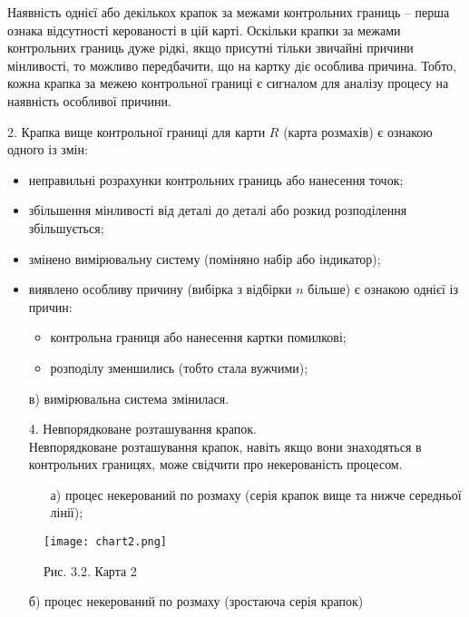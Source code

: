 Наявність однієї або декількох крапок за межами контрольних границь –
перша ознака відсутності керованості в цій карті. Оскільки крапки за межами
контрольних границь дуже рідкі, якщо присутні тільки звичайні причини
мінливості, то можливо передбачити, що на картку діє особлива причина.
Тобто, кожна крапка за межею контрольної границі є сигналом для аналізу
процесу на наявність особливої причини.

2. Крапка вище контрольної границі для карти $R$ (карта розмахів) є
ознакою одного із змін:

\begin{itemize}
    \item неправильні розрахунки контрольних границь або нанесення точок;
    \item збільшення мінливості від деталі до деталі або розкид розподілення збільшується;
    \item змінено вимірювальну систему (поміняно набір або індикатор);
    \item виявлено особливу причину (вибірка з відбірки $n$ більше) є ознакою однієї із причин:
    \begin{itemize}
        \item контрольна границя або нанесення картки помилкові;
        \item розподілу зменшились (тобто стала вужчими);
    \end{itemize}
\end{itemize}

\begin{itemize}
    \item[в)] вимірювальна система змінилася.
    \item[4.] Невпорядковане розташування крапок.\\
    Невпорядковане розташування крапок, навіть якщо вони знаходяться в контрольних границях, може свідчити про некерованість процесом.
    \begin{itemize}
        \item[а)] процес некерований по розмаху (серія крапок вище та нижче середньої лінії);
    \end{itemize}
\end{itemize}

\begin{figure}[H]
\centering
\texttt{[image: chart2.png]} %
\caption{Рис. 3.2. Карта 2}
\label{fig:chart2}
\end{figure}

\begin{itemize}
    \item[б)] процес некерований по розмаху (зростаюча серія крапок)
\end{itemize}

